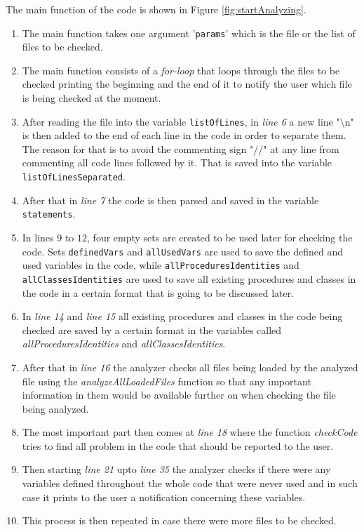 \documentclass[11pt]{report}
\begin{document}
The main function of the code is shown in Figure \ref{fig:startAnalyzing}.
\begin{enumerate}
\item The main function takes one argument '\texttt{params}' which is the file or the list of files to be checked.
\item The main function consists of a \textsl{for-loop} that loops through the files to be checked printing the beginning and the end of it to notify the user which file is being checked at the moment. 
\item After reading the file into the variable \texttt{listOfLines}, in \textsl{line 6} a new line "$\setminus$n" is then added to the end of each line in the code in order to separate them. The reason for that is to avoid the commenting sign "//" at any line from commenting all code lines followed by it. That is saved into the variable \texttt{listOfLinesSeparated}.
\item After that in \textsl{line 7} the code is then parsed and saved in the variable \texttt{statements}.
\item In lines $9$ to $12$, four empty sets are created to be used later for checking the code. Sets \texttt{definedVars} and \texttt{allUsedVars} are used to save the defined and used variables in the code, while \texttt{allProceduresIdentities} and \texttt{allClassesIdentities} are used to save all existing procedures and classes in the code in a certain format that is going to be discussed later.
\item In \textsl{line 14} and \textsl{line 15} all existing procedures and classes in the code being checked are saved by a certain format in the variables called \textsl{allProceduresIdentities} and \textsl{allClassesIdentities}.
\item After that in \textsl{line 16} the analyzer checks all files being loaded by the analyzed file using the \textsl{analyzeAllLoadedFiles} function so that any important information in them would be available further on when checking the file being analyzed.
\item The most important part then comes at \textsl{line 18} where the function \textsl{checkCode} tries to find all problem in the code that should be reported to the user.
\item Then starting \textsl{line 21} upto \textsl{line 35} the analyzer checks if there were any variables defined throughout the whole code that were never used and in such case it prints to the user a notification concerning these variables.
\item This process is then repeated in case there were more files to be checked.
\end{enumerate}
\end{document}
